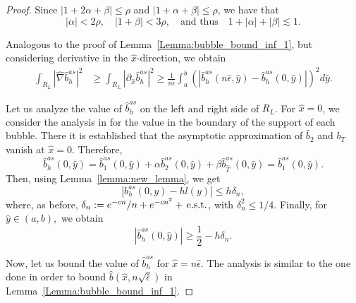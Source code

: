 \documentclass{article}
\newcommand{\est}{\text{\,e.s.t.}\xspace}
\newcommand{\nsep}{\ensuremath{n\sqrt{\epsilon}}}
\newcommand{\oab}{\ensuremath{1+\alpha+\beta}}
\newcommand{\otab}{\ensuremath{1+2\alpha+\beta}}
\newcommand{\hatT}{\ensuremath{{\hat{T}}}}
\newcommand{\hatb}{\ensuremath{\hat{b}}}
\newcommand{\hatx}{\ensuremath{{\hat{x}}}}
\newcommand{\haty}{\ensuremath{{\hat{y}}}}
\newcommand{\hatN}{\ensuremath{\hat{\nabla}}}
\newcommand{\hatnsep}{\ensuremath{n\sqrt{\hat{\epsilon}}}}
\begin{document}
\begin{appendix}
\begin{proof}
Since
$|1+2\alpha+\beta|\leq\rho$ and $|1+\alpha+\beta|\leq\rho$, we have that
\begin{equation*}
    |\alpha|< 2\rho, \quad |1+\beta|< 3\rho,
    \quad\text{and thus}\quad  
    1+|\alpha|+|\beta| \lesssim 1 
    .
\end{equation*}

Analogous to the proof of Lemma~\ref{Lemma:bubble_bound_inf_1}, but considering derivative in the $\hatx$-direction, we obtain
\begin{equation}
\begin{aligned}\label{eq:int_RL}
    \int_{R_L}|\hatN \hatb_h^{as}|^2&
    \geq\int_{R_L}|\partial_\hatx \hatb_h^{as}|^2
    \geq \frac{1}{n\hat{\epsilon}}\int_a^b(|\hatb_h^{as}(n\hat{\epsilon},\haty) - \hatb_h^{as}(0,\haty)|)^2 d\haty. 
\end{aligned}
\end{equation}

Let us analyze the value of $\hatb_h^{as}$ on the left and right side of $R_L$. For $\hatx=0$, we consider the analysis in \cite[Eq. 59]{GieEtAl:13} for the value in the boundary of the support of each bubble. There it is established that the asymptotic approximation of $\hatb_2$ and $b_T$ vanish at $\hat{x}=0$. Therefore,
\begin{equation*}
    \hatb_h^{as}(0,\haty)=\hatb_1^{as}(0,\haty) + \alpha \hatb_2^{as}(0,\haty) +\beta \hatb_\hatT^{as}(0,\haty) = \hatb_1^{as}(0,\haty).
\end{equation*}
Then, using Lemma~\ref{lemma:new_lemma}, we get
\begin{equation*}
    |b_h^{as}(0,y) - hl(y)|\leq h\delta_n,
\end{equation*}
where, as before, $\delta_n := e^{-cn}/n+e^{-cn^2}+\est$, with $\delta_n^2 \le 1/4$. Finally, for $\haty \in (a,b),$ we obtain
\begin{equation}\label{eq:bh_0}
    |\hatb_h^{as}(0,\haty)| \geq \frac{1}{2} - h\delta_n.
\end{equation}

Now, let us bound the value of $\hatb_h^{as}$ for $\hatx=n\hat{\epsilon}.$ The analysis is similar to the one done in order to bound $\hatb(\hatx,\hatnsep)$ in Lemma~\ref{Lemma:bubble_bound_inf_1}.



\end{proof}
\end{appendix}
\end{document}
